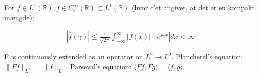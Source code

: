 For $f \in L^1(\mathbb{R}), f \in C_c^\infty(\mathbb{R}) \subset L^1(\mathbb{R})$ (hvor c'et angiver, at det er en kompakt mængde);

\begin{align*}
|\hat{f}(\gamma)| \leq \frac{1}{\sqrt{2\pi}} \int_{-\infty}^\infty |f(x)| \cdot |e^{j\omega x}| dx < \infty
\end{align*}

F is continuously extended as an operator on $L^2 \to L^2$.
Plancherel's equation: $\|Ff\|_{L^2} = \|f\|_{L^2}$.
Parseval's equation: $\langle Ff, Fg \rangle = \langle f,g \rangle$.

%
%
%
%
